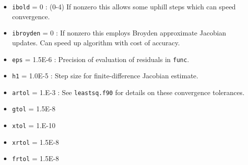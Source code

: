 \documentclass[12pt,pdf,singlespace]{article}
\begin{document}

\begin{itemize}

\item \texttt{ibold} = 0 : (0-4) If nonzero this allows some uphill steps which can speed convergence.
\item \texttt{ibroyden} = 0 : If nonzero this employs Broyden approximate Jacobian updates. Can speed up algorithm with cost of accuracy.
\item \texttt{eps} = 1.5E-6 : Precision of evaluation of residuals in \texttt{func}.


\item \texttt{h1} = 1.0E-5 : Step size for finite-difference Jacobian estimate.
\item \texttt{artol} = 1.E-3 : See \texttt{leastsq.f90} for details on these convergence tolerances.
\item \texttt{gtol} = 1.5E-8
\item \texttt{xtol} = 1.E-10
\item \texttt{xrtol} = 1.5E-8
\item \texttt{frtol} = 1.5E-8

\end{itemize}


\end{document}
